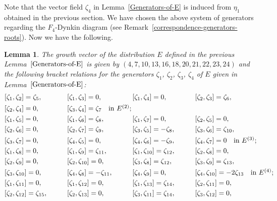 \documentclass[pdftex]{sigma}
\numberwithin{equation}{section}
\newtheorem{Lemma}[Theorem]{Lemma}
\theoremstyle{definition}
\newcommand{\0}{\boldsymbol{0}}
\begin{document}
Note that the vector field $\zeta_4$ in Lemma~\ref{Generators-of-E} is induced from $\eta_1$
obtained in the previous section. We have chosen the above system of generators regarding
the $F_4$-Dynkin diagram (see Remark~\ref{correspondence-generators-roots}).
Now we have the following.


\begin{Lemma}
\label{F_4-bracket-relations}
The growth vector of the distribution $E$ defined in the previous Lemma~$\ref{Generators-of-E}$
is given by $(4, 7, 10, 13, 16, 18, 20, 21, 22, 23, 24)$ and the following bracket relations for the generators
$\zeta_1$, $\zeta_2$, $\zeta_3$, $\zeta_4$ of $E$ given in Lemma~$\ref{Generators-of-E}$:
\begin{alignat*}{8}
&[\zeta_1, \zeta_2] = \zeta_5,\qquad&& [\zeta_1, \zeta_3] = 0,\qquad&& [\zeta_1, \zeta_4] = 0,\qquad&& [\zeta_2, \zeta_3] = \zeta_6,&\\
& [\zeta_2, \zeta_4] = 0,\qquad&& [\zeta_3, \zeta_4] = \zeta_7 \quad \makebox[0pt][l]{\text{in $E^{(2)}$;}}&
\\
&[\zeta_1, \zeta_5] = 0,\qquad&& [\zeta_1, \zeta_6] = \zeta_8,\qquad&& [\zeta_1, \zeta_7] = 0,\qquad&& [\zeta_2, \zeta_5] = 0,&\\
&
[\zeta_2, \zeta_6] = 0,\qquad&&[\zeta_2, \zeta_7] = \zeta_9,\qquad&&[\zeta_3, \zeta_5] = - \zeta_8,\qquad&& [\zeta_3, \zeta_6] = \zeta_{10},&\\
&[\zeta_3, \zeta_7] = 0,\qquad&& [\zeta_4, \zeta_5] = 0,\qquad&& [\zeta_4, \zeta_6] = - \zeta_9,\qquad&& [\zeta_4, \zeta_7] = 0 \quad \makebox[0pt][l]{\text{in $E^{(3)}$;}}&\\
&[\zeta_1, \zeta_8] = 0,\qquad&& [\zeta_1, \zeta_9] = \zeta_{11},\qquad&& [\zeta_1, \zeta_{10}] = \zeta_{12},\qquad&&
[\zeta_2, \zeta_8] = 0,&\\
& [\zeta_2, \zeta_9] = 0,\qquad&& [\zeta_2, \zeta_{10}] = 0,\qquad&& [\zeta_3, \zeta_8] = \zeta_{12},\qquad&&[\zeta_3, \zeta_9] = \zeta_{13},&
\\
&[\zeta_3, \zeta_{10}] = 0,\qquad&& [\zeta_4, \zeta_8] = - \zeta_{11},\qquad&& [\zeta_4, \zeta_9] = 0,\qquad&& [\zeta_4, \zeta_{10}] = - 2\zeta_{13} \quad \makebox[0pt][l]{\text{in $E^{(4)}$;}}&
\\
&[\zeta_1, \zeta_{11}] = 0,\qquad&& [\zeta_1, \zeta_{12}] = 0,\qquad&& [\zeta_1, \zeta_{13}] = \zeta_{14},\qquad&&
[\zeta_2, \zeta_{11}] = 0,& \\
&[\zeta_2, \zeta_{12}] = \zeta_{15},\qquad&& [\zeta_2, \zeta_{13}] = 0,\qquad&& [\zeta_3, \zeta_{11}] = \zeta_{14},\qquad&&[\zeta_3, \zeta_{12}] = 0,

\end{alignat*}
\end{Lemma}
\end{document}
